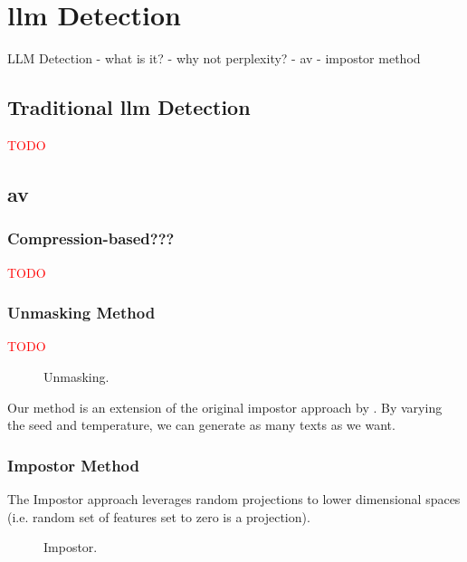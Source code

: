 \chapter{\acs{llm} Detection}
\label{chap:llm_detection}
    LLM Detection
    - what is it?
    - why not perplexity?
    - av
    - impostor method

\section{Traditional \acs{llm} Detection}
\label{sec:llm_detection}
\textcolor{red}{TODO}






\section{\acl{av}}

\subsection{Compression-based???}
\textcolor{red}{TODO}


\subsection{Unmasking Method}
\textcolor{red}{TODO}


\begin{figure}[htbp]
    \centering
    
    \caption{Unmasking.}
    \label{fig:unmasking}
\end{figure}
Our method is an extension of the original impostor approach by \citet{koppel_determining_2014}.
By varying the seed and temperature, we can generate as many texts as we want.
  
\subsection{Impostor Method}
\label{sec:impostor_method_theory}

The Impostor approach leverages random projections to lower dimensional spaces (i.e. random set of features set to zero is a projection).
\begin{figure}[htbp]
    \centering
    
    \caption{Impostor.}
    \label{fig:impostor}
\end{figure}


